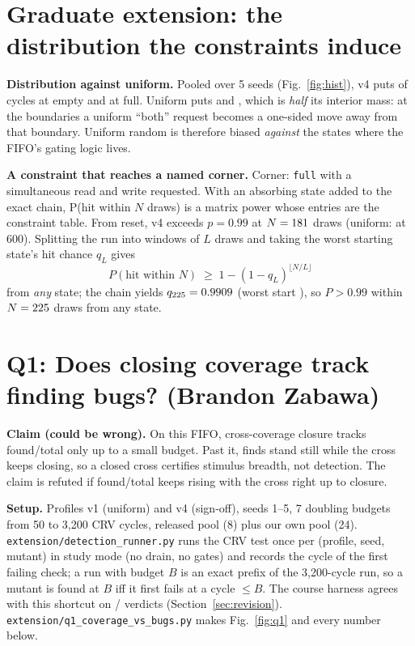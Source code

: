 \documentclass[10pt]{article}
\newcommand{\code}[1]{\texttt{#1}}
\begin{document}
\section{Graduate extension: the distribution the constraints induce}
\textbf{Distribution against uniform.} Pooled over 5 seeds (Fig.~\ref{fig:hist}), v4 puts \HistShpEmpty{} of cycles at empty and \HistShpFull{} at full. Uniform puts \HistUniEmpty{} and \HistUniFull{}, which is \emph{half} its interior mass: at the boundaries a uniform ``both'' request becomes a one-sided move away from that boundary. Uniform random is therefore biased \emph{against} the states where the FIFO's gating logic lives.

\textbf{A constraint that reaches a named corner.} Corner: \code{full} with a simultaneous read and write requested. With an absorbing state added to the exact chain, P(hit within $N$ draws) is a matrix power whose entries are the constraint table. From reset, v4 exceeds $p=0.99$ at $N=181$ draws (uniform: \CornerUniSixHundred{} at 600). Splitting the run into windows of $L$ draws and taking the worst starting state's hit chance $q_L$ gives
\[ P(\text{hit within } N) \;\ge\; 1-(1-q_L)^{\lfloor N/L\rfloor} \]
from \emph{any} state; the chain yields $q_{225}=0.9909$ (worst start \CornerShpWorst), so $P>0.99$ within $N=225$ draws from any state.

\section{Q1: Does closing coverage track finding bugs? \normalfont\small(Brandon Zabawa)}\label{sec:q1}
\textbf{Claim (could be wrong).} On this FIFO, cross-coverage closure tracks found/total only up to a small budget. Past it, finds stand still while the cross keeps closing, so a closed cross certifies stimulus breadth, not detection. The claim is refuted if found/total keeps rising with the cross right up to closure.

\textbf{Setup.} Profiles v1 (uniform) and v4 (sign-off), seeds 1--5, 7 doubling budgets from 50 to 3,200 CRV cycles, released pool (8) plus our own pool (24). \code{extension/detection\_runner.py} runs the CRV test once per (profile, seed, mutant) in study mode (no drain, no gates) and records the cycle of the first failing check; a run with budget $B$ is an exact prefix of the 3,200-cycle run, so a mutant is found at $B$ iff it first fails at a cycle $\le B$. The course harness agrees with this shortcut on \CrossAagree/\CrossAtotal{} verdicts (Section~\ref{sec:revision}). \code{extension/q1\_coverage\_vs\_bugs.py} makes Fig.~\ref{fig:q1} and every number below.
\end{document}
